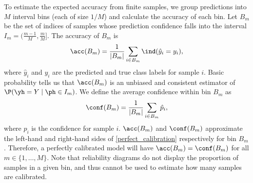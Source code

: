 To estimate the expected accuracy from finite samples, we group predictions into $M$ interval bins (each of size $1/M$) and calculate the accuracy of each bin.
Let $B_m$ be the set of indices of samples whose prediction confidence falls into the interval $I_m = (\frac{m-1}{M},\frac{m}{M}]$.
The accuracy of $B_m$ is
%
$$\acc(B_m) = \frac{1}{|B_m|}\sum_{i \in B_m}\ind(\hat{y}_i = y_i),$$
%
where $\hat{y}_i$ and $y_i$ are the predicted and true class labels for
sample $i$.
%
Basic probability tells us that $\acc(B_m)$ is an unbiased and consistent estimator of $\P(\yh = Y \mid \ph \in I_m)$. We define the average confidence within bin $B_m$ as
%
$$\conf(B_m) = \frac{1}{|B_m|}\sum_{i \in B_m}\hat{p}_i,$$
%
where $\hat{p}_i$ is the confidence for sample $i$.
%
$\acc(B_m)$ and $\conf(B_m)$ approximate the left-hand and right-hand sides of \eqref{perfect_calibration} respectively for bin $B_m$.
Therefore, a perfectly calibrated model will have $\acc(B_m) = \conf(B_m)$ for all $m \in \{ 1, \ldots, M \}$.
Note that reliability diagrams do not display the proportion of samples in a given bin, and thus cannot be used to estimate how many samples are calibrated.


